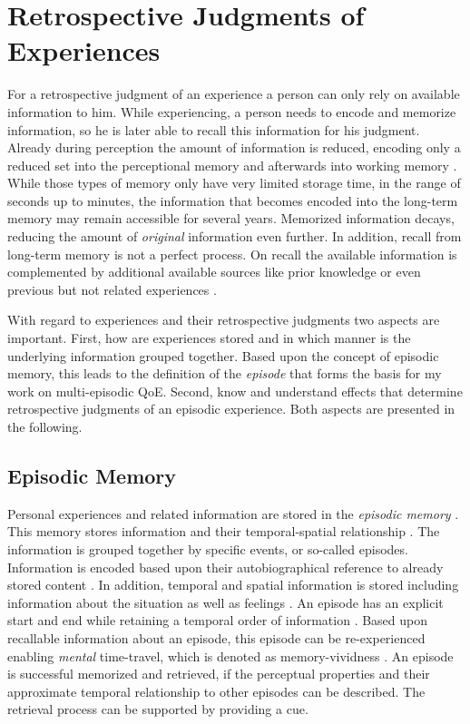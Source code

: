 \section{Retrospective Judgments of Experiences}\label{chap:03}
For a retrospective judgment of an experience a person can only rely on available information to him.
While experiencing, a person needs to encode and memorize information, so he is later able to recall this information for his judgment.
Already during perception the amount of information is reduced, encoding only a reduced set into the perceptional memory and afterwards into working memory \citep[\cf,][p. 8f.]{raake_speech_2006}.
While those types of memory only have very limited storage time, in the range of seconds up to minutes, the information that becomes encoded into the long-term memory may remain accessible for several years.
Memorized information decays, reducing the amount of \emph{original} information even further.
In addition, recall from long-term memory is not a perfect process.
On recall the available information is complemented by additional available sources like prior knowledge or even previous but not related experiences \citep[\cf,][]{schacter_seven_2003}.

With regard to experiences and their retrospective judgments two aspects are important.
First, how are experiences stored and in which manner is the underlying information grouped together.
Based upon the concept of episodic memory, this leads to the definition of the \emph{episode} that forms the basis for my work on multi-episodic \ac{QoE}.
Second, know and understand effects that determine retrospective judgments of an episodic experience.
Both aspects are presented in the following.

\subsection{Episodic Memory}
Personal experiences and related information are stored in the \emph{episodic memory} \citep{tulving_episodic_1972}.
This memory stores information and their temporal-spatial relationship \citep[][p. 385]{tulving_episodic_1972}.
The information is grouped together by specific events, or so-called episodes.
Information is encoded based upon their autobiographical reference to already stored content \citep[][p. 385f.]{tulving_episodic_1972}.
In addition, temporal and spatial information is stored including information about the situation as well as feelings \citep[][p. 385f.]{tulving_episodic_1972}.
An episode has an explicit start and end while retaining a temporal order of information \citep[][p. 262]{conway_construction_2000}.
Based upon recallable information about an episode, this episode can be re-experienced enabling \emph{mental} time-travel, which is denoted as memory-vividness \citep{conway_construction_2000}.
An episode is successful memorized and retrieved, if the perceptual properties and their approximate temporal relationship to other episodes can be described.
The retrieval process can be supported by providing a cue.

